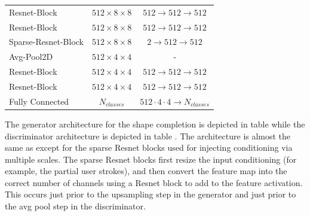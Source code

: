 \begin{table}[h]
\begin{tabular}{l c c}
\midrule
\small{Resnet-Block} & \small{$512 \times 8 \times 8$} & \small{$512 \rightarrow 512 \rightarrow 512$} \\
\small{Resnet-Block} & \small{$512 \times 8 \times 8$} & \small{$512 \rightarrow 512 \rightarrow 512$} \\
\small{Sparse-Resnet-Block} & \small{$512 \times 8 \times 8$} & \small{$2 \rightarrow 512 \rightarrow 512$} \\
\small{Avg-Pool2D } & \small{$512 \times 4 \times 4$} & - \\
\midrule
\small{Resnet-Block} & \small{$512 \times 4 \times 4$} & \small{$512 \rightarrow 512 \rightarrow 512$} \\
\small{Resnet-Block} & \small{$512 \times 4 \times 4$} & \small{$512 \rightarrow 512 \rightarrow 512$} \\
\small{Fully Connected} & \small{$N_{classes}$} & \small{\small{$ 512 \cdot 4 \cdot 4 \rightarrow N_{classes}$}} \\
\bottomrule %
\end{tabular}
\label{table:D_S} %
\end{table}


The generator architecture for the shape completion is depicted in table  while the discriminator architecture is depicted in table . 
The architecture is almost the same as \cite{mescheder2018training} except for the sparse Resnet blocks used for injecting conditioning via multiple scales. 
The sparse Resnet blocks first resize the input conditioning (for example, the partial user strokes), and then convert the feature map into the correct number of channels using a Resnet block to add to the feature activation.
This occurs just prior to the upsampling step in the generator and just prior to the avg pool step in the discriminator. 



